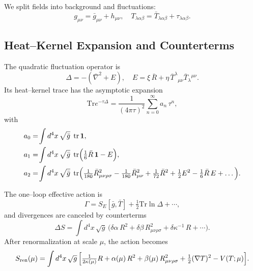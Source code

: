 \documentclass{article}
\DeclareMathOperator{\tr}{tr}
\newcommand{\Tr}{\mathrm{Tr}}
\begin{document}
We split fields into background and fluctuations:
\[
  g_{\mu\nu} = \bar g_{\mu\nu} + h_{\mu\nu}, 
  \quad
  T_{\lambda\alpha\beta} = \bar T_{\lambda\alpha\beta} + \tau_{\lambda\alpha\beta}.
\]

\medskip
\begin{center}
\end{center}
\medskip


\subsection{Heat–Kernel Expansion and Counterterms}
\label{sec:heat_kernel}

The quadratic fluctuation operator is
\[
  \Delta = -(\bar\nabla^2 + E),
  \quad
  E = \xi \,\bar R + \eta\,\bar T^{\lambda}{}_{\mu\nu}\bar T_{\lambda}{}^{\mu\nu}.
\]
Its heat–kernel trace has the asymptotic expansion
\[
  \Tr e^{-\tau\Delta}
  = \frac{1}{(4\pi\tau)^2}\sum_{n=0}^\infty a_n\,\tau^n,
\]
with
\begin{align*}
  a_0 &= \!\int d^4x\,\sqrt{\bar g}\;\tr\mathbf1,\\
  a_1 &= \!\int d^4x\,\sqrt{\bar g}\;\tr\Bigl(\tfrac16\bar R\,\mathbf1 - E\Bigr),\\
  a_2 &= \!\int d^4x\,\sqrt{\bar g}\;\tr\Bigl(
      \tfrac1{180}\bar R_{\mu\nu\rho\sigma}^2
    - \tfrac1{180}\bar R_{\mu\nu}^2
    + \tfrac1{72}\bar R^2
    + \tfrac12E^2
    - \tfrac16\bar R\,E
    + \dots
  \Bigr).
\end{align*}

The one–loop effective action is
\[
  \Gamma = S_E[\bar g,\bar T] + \tfrac12\Tr\ln\Delta + \cdots,
\]
and divergences are canceled by counterterms
\[
  \Delta S = \int d^4x\,\sqrt{g}\,
  \bigl(\delta\alpha\,R^2 + \delta\beta\,R_{\mu\nu\rho\sigma}^2
    + \delta\kappa^{-1}\,R + \cdots\bigr).
\]
After renormalization at scale \(\mu\), the action becomes
\[
  S_{\rm ren}(\mu)
  = \int d^4x\,\sqrt{g}\,
  \Bigl[
    \tfrac1{2\kappa(\mu)}R
    + \alpha(\mu)\,R^2
    + \beta(\mu)\,R_{\mu\nu\rho\sigma}^2
    + \tfrac12(\nabla T)^2
    - V(T;\mu)
  \Bigr].
\]
\end{document}
